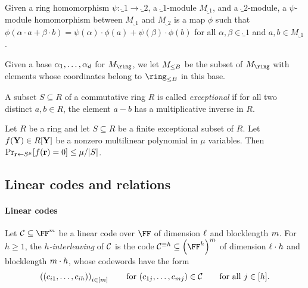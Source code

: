 \documentclass[11pt,letterpaper,usenames,dvipsnames]{article}
\begin{document}
Given a ring homomorphism $\psi: \ring_1\to \ring_2$, a $\ring_1$-module $M_{\ring_1}$, and a $\ring_2$-module, a $\psi$-module homomorphism between $M_{\ring_1}$ and $M_{\ring_2}$ is a map $\phi$ such that $\phi(\alpha\cdot a + \beta \cdot b) = \psi(\alpha)\cdot \phi(a) + \psi(\beta) \cdot \phi(b)$ for all $\alpha,\beta\in \ring_1$ and $a,b\in M_{\ring_1}$.

   
Given a base $\alpha_1,\ldots, \alpha_d$ for $M_\ring$, we let $M_{\leq B}$ be the subset of $M_\ring$ with elements whose coordinates belong to $\ringbitbound{B}$ in this base.








A subset $S\subseteq R$ of a commutative ring $R$ is called \emph{exceptional} if for all two distinct $a,b\in R$, the element $a-b$ has a multiplicative inverse in $R$.
\begin{lemma}
\label{lem:sz_exceptional_sets}
Let $R$ be a ring and let $S\subseteq R$ be a finite exceptional subset of $R$. Let $f(\mathbf{Y})\in R[\mathbf{Y}]$ be a nonzero multilinear polynomial in $\mu$ variables. Then
$\Pr_{\mathbf{r}\gets S^\mu}[f(\mathbf{r})=0] \le \mu/|S|$.
\end{lemma}

\subsection{Linear codes and relations}

\paragraph{Linear codes}

Let $\cC \subseteq \FF^{\codelength}$ be a linear code over $\FF$ of dimension $\ell$ and blocklength $m$. For $h\geq 1$, the \emph{$h$-interleaving} of $\mathcal{C}$ is the code $\cC^{\equiv h} \subseteq \left(\FF^{h}\right)^{\codelength}$ of dimension $\ell\cdot h$ and blocklength $m\cdot h$, whose codewords have the form $$\left((c_{i1},\ldots, c_{ih})\right)_{i\in [m]} \qquad \text{for } (c_{1j},\ldots, c_{m j})\in \mathcal{C} \qquad \text{for all } j\in [h].$$
\end{document}
